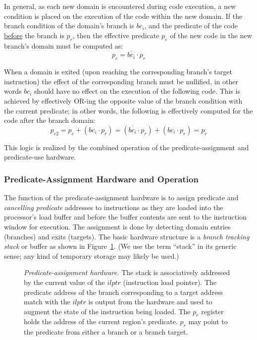 \documentclass[10pt,dvips]{article}
\begin{document}
In general,
as each new domain is encountered during code execution, a new condition is
placed on the execution of the code within the new domain. If the branch condition
of the domain's branch is $bc_i$, and the predicate of the code \underline{before}
the branch is $p_r$, then the effective predicate $p_e$ of the new code in the new
branch's domain must be computed as: \[p_e = \overline{bc_i} \cdot p_r \]

When a domain is exited (upon reaching the corresponding branch's target instruction)
the effect of the corresponding branch must be nullified, in other words $bc_i$
should have no effect on the execution of the following code. This is achieved by
effectively OR-ing the opposite value of the branch condition with the current
predicate; in other words, the following is effectively computed for the code
after the branch domain:
\[p_{e2} = p_e + (bc_i \cdot p_r) = (\overline{bc_i} \cdot p_r) + (bc_i \cdot p_r) = p_r \]

This logic is realized by the combined operation of the predicate-assignment
and predicate-use hardware.

\subsubsection{Predicate-Assignment Hardware and Operation}
The function of the predicate-assignment hardware is to assign predicate and
{\it cancelling predicate} addresses to instructions as they are loaded into the
processor's load buffer and before the buffer contents are sent to the
instruction window for execution. The assignment is done by detecting
domain entries (branches) and exits (targets). The basic hardware structure
is a {\it branch tracking stack} or buffer
as shown in Figure~\ref{branchstack}. (We use the term
``stack'' in its generic sense; any kind of temporary storage may likely be used.)

\begin{figure}
\centering
{}
\caption{{\em Predicate-assignment hardware.}
The stack is associatively addressed by the current value of the $ilptr$ (instruction
load pointer). The predicate address of the branch corresponding to
a target address match with the $ilptr$ is output from the hardware and used to
augment the state of the instruction being loaded. The $p_r$ register holds the
address of the current region's predicate. $p_r$ may point to the predicate
from either a branch or a branch target.}
\label{branchstack}
\end{figure}
\end{document}
